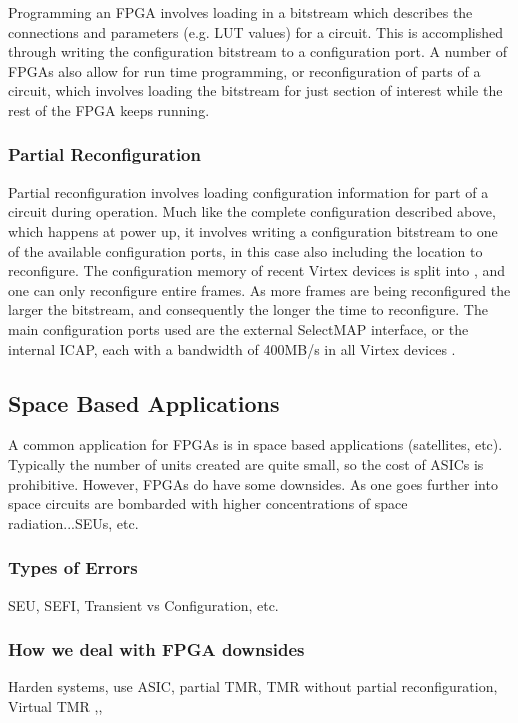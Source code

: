 \documentclass[12pt,drafta4paper,oneside]{memoir} %
\begin{document}
Programming an \ac{FPGA} involves loading in a bitstream which describes the connections and parameters (e.g. \ac{LUT} values) for a circuit. This is accomplished through writing the configuration bitstream to a configuration port. A number of \acp{FPGA} also allow for run time programming, or reconfiguration of parts of a circuit, which involves loading the bitstream for just section of interest while the rest of the \ac{FPGA} keeps running.

\subsubsection{Partial Reconfiguration}
Partial reconfiguration involves loading configuration information for part of a circuit during operation. Much like the complete configuration described above, which happens at power up, it involves writing a configuration bitstream to one of the available configuration ports, in this case also including the location to reconfigure. The configuration memory of recent Virtex devices is split into , and one can only reconfigure entire frames. As more frames are being reconfigured the larger the bitstream, and consequently the longer the time to reconfigure. The main configuration ports used are the external SelectMAP interface, or the internal \ac{ICAP}, each with a bandwidth of 400MB/s in all Virtex devices .


\subsection{Space Based Applications}
A common application for \acp{FPGA} is in space based applications (satellites, etc). Typically the number of units created are quite small, so the cost of \acp{ASIC} is prohibitive. However, \acp{FPGA} do have some downsides. As one goes further into space circuits are bombarded with higher concentrations of space radiation...SEUs, etc.

\subsubsection{Types of Errors}
SEU, SEFI, Transient vs Configuration, etc.

\subsubsection{How we deal with FPGA downsides}
Harden systems, use ASIC, partial TMR, TMR without partial reconfiguration, Virtual TMR
\cite{FPGAReview},\cite{VTMR},\cite{HardeningTechniques}
\end{document}
